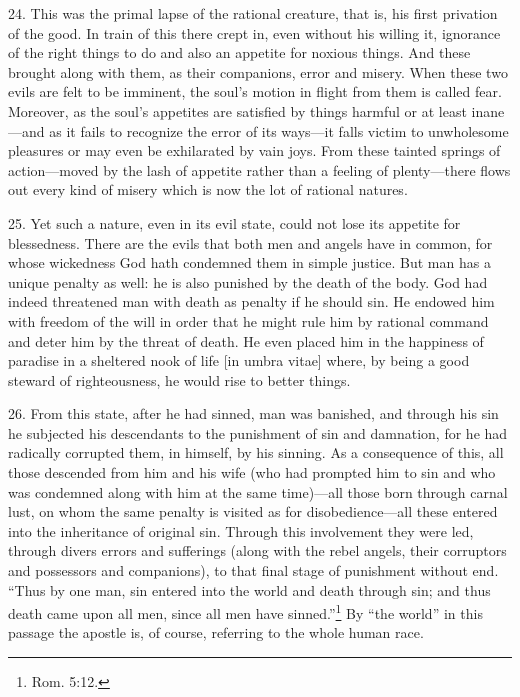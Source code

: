 24. This was the primal lapse of the rational creature, that is, his first privation of the good. In train of this there crept in, even without his willing it, ignorance of the right things to do and also an appetite for noxious things. And these brought along with them, as their companions, error and misery. When these two evils are felt to be imminent, the soul's motion in flight from them is called fear. Moreover, as the soul's appetites are satisfied by things harmful or at least inane—and as it fails to recognize the error of its ways—it falls victim to unwholesome pleasures or may even be exhilarated by vain joys. From these tainted springs of action—moved by the lash of appetite rather than a feeling of plenty—there flows out every kind of misery which is now the lot of rational natures.

25. Yet such a nature, even in its evil state, could not lose its appetite for blessedness. There are the evils that both men and angels have in common, for whose wickedness God hath condemned them in simple justice. But man has a unique penalty as well: he is also punished by the death of the body. God had indeed threatened man with death as penalty if he should sin. He endowed him with freedom of the will in order that he might rule him by rational command and deter him by the threat of death. He even placed him in the happiness of paradise in a sheltered nook of life [in umbra vitae] where, by being a good steward of righteousness, he would rise to better things.

26. From this state, after he had sinned, man was banished, and through his sin he subjected his descendants to the punishment of sin and damnation, for he had radically corrupted them, in himself, by his sinning. As a consequence of this, all those descended from him and his wife (who had prompted him to sin and who was condemned along with him at the same time)—all those born through carnal lust, on whom the same penalty is visited as for disobedience—all these entered into the inheritance of original sin. Through this involvement they were led, through divers errors and sufferings (along with the rebel angels, their corruptors and possessors and companions), to that final stage of punishment without end. ``Thus by one man, sin entered into the world and death through sin; and thus death came upon all men, since all men have sinned.''\footnote{Rom. 5:12.} By ``the world'' in this passage the apostle is, of course, referring to the whole human race.

